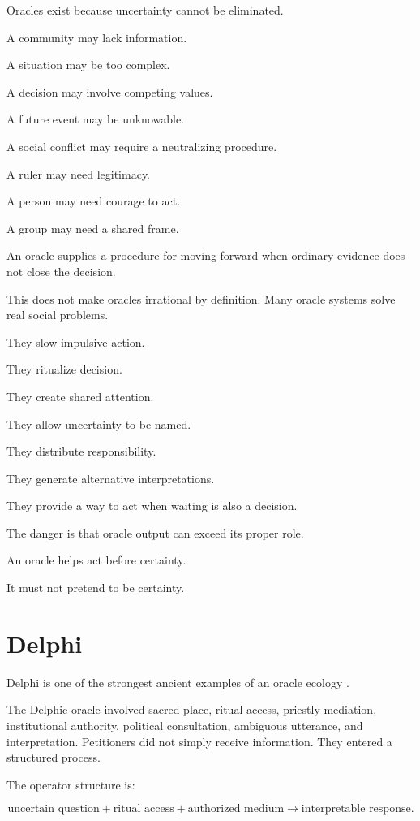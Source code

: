 \documentclass[11pt]{book}
\begin{document}
Oracles exist because uncertainty cannot be eliminated.

A community may lack information.

A situation may be too complex.

A decision may involve competing values.

A future event may be unknowable.

A social conflict may require a neutralizing procedure.

A ruler may need legitimacy.

A person may need courage to act.

A group may need a shared frame.

An oracle supplies a procedure for moving forward when ordinary evidence does not close the decision.

This does not make oracles irrational by definition. Many oracle systems solve real social problems.

They slow impulsive action.

They ritualize decision.

They create shared attention.

They allow uncertainty to be named.

They distribute responsibility.

They generate alternative interpretations.

They provide a way to act when waiting is also a decision.

The danger is that oracle output can exceed its proper role.

An oracle helps act before certainty.

It must not pretend to be certainty.

\section{Delphi}

Delphi is one of the strongest ancient examples of an oracle ecology \cite{Fontenrose1978DelphicOracle,ParkeWormell1956DelphicOracle}.

The Delphic oracle involved sacred place, ritual access, priestly mediation, institutional authority, political consultation, ambiguous utterance, and interpretation. Petitioners did not simply receive information. They entered a structured process.

The operator structure is:

\[
\text{uncertain question}
+
\text{ritual access}
+
\text{authorized medium}
\rightarrow
\text{interpretable response}.
\]
\end{document}
